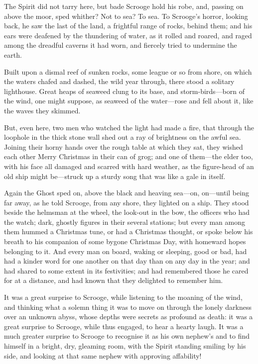 The Spirit did not tarry here, but bade Scrooge hold his robe, and, passing on
above the moor, sped whither? Not to sea? To sea. To Scrooge's horror, looking
back, he saw the last of the land, a frightful range of rocks, behind them; and
his ears were deafened by the thundering of water, as it rolled and roared, and
raged among the dreadful caverns it had worn, and fiercely tried to undermine
the earth.

Built upon a dismal reef of sunken rocks, some league or so from shore, on which
the waters chafed and dashed, the wild year through, there stood a solitary
lighthouse. Great heaps of seaweed clung to its base, and storm-birds—born of
the wind, one might suppose, as seaweed of the water—rose and fell about it,
like the waves they skimmed.

But, even here, two men who watched the light had made a fire, that through the
loophole in the thick stone wall shed out a ray of brightness on the awful sea.
Joining their horny hands over the rough table at which they sat, they wished
each other Merry Christmas in their can of grog; and one of them—the elder too,
with his face all damaged and scarred with hard weather, as the figure-head of
an old ship might be—struck up a sturdy song that was like a gale in itself.

Again the Ghost sped on, above the black and heaving sea—on, on—until being far
away, as he told Scrooge, from any shore, they lighted on a ship. They stood
beside the helmsman at the wheel, the look-out in the bow, the officers who had
the watch; dark, ghostly figures in their several stations; but every man among
them hummed a Christmas tune, or had a Christmas thought, or spoke below his
breath to his companion of some bygone Christmas Day, with homeward hopes
belonging to it. And every man on board, waking or sleeping, good or bad, had
had a kinder word for one another on that day than on any day in the year; and
had shared to some extent in its festivities; and had remembered those he cared
for at a distance, and had known that they delighted to remember him.

It was a great surprise to Scrooge, while listening to the moaning of the wind,
and thinking what a solemn thing it was to move on through the lonely darkness
over an unknown abyss, whose depths were secrets as profound as death: it was a
great surprise to Scrooge, while thus engaged, to hear a hearty laugh. It was a
much greater surprise to Scrooge to recognise it as his own nephew's and to find
himself in a bright, dry, gleaming room, with the Spirit standing smiling by his
side, and looking at that same nephew with approving affability!

